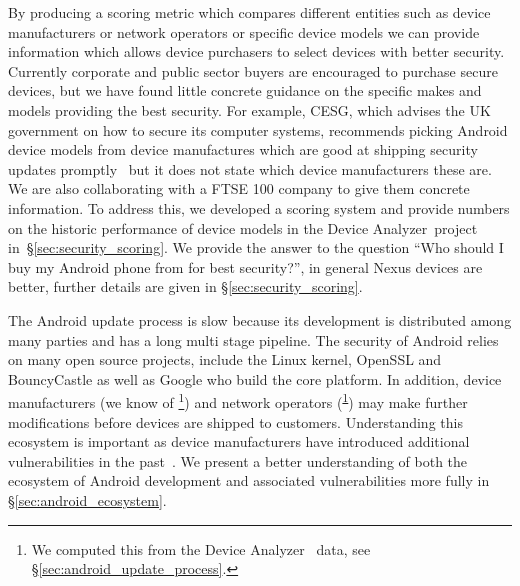 \documentclass{sig-alternate}
\newcommand{\da}{Device Analyzer}
\newcommand{\dafoot}{\textsuperscript{\ref{foot:dadata}}}
\begin{document}
By producing a scoring metric which compares different entities such as device manufacturers or network operators or specific device models we can provide information which allows device purchasers to select devices with better security.
Currently corporate and public sector buyers are encouraged to purchase secure devices, but we have found little concrete guidance on the specific makes and models providing the best security.
For example, CESG, which advises the UK government on how to secure its computer systems, recommends picking Android device models from device manufactures which are good at shipping security updates promptly~\cite{CESG2013} but it does not state which device manufacturers these are.
We are also collaborating with a FTSE 100 company to give them concrete information.
To address this, we developed a scoring system and provide numbers on the historic performance of device models in the \da\ project in~\S\ref{sec:security_scoring}.
We provide the answer to the question ``Who should I buy my Android phone from for best security?'', in general Nexus devices are better, further details are given in \S\ref{sec:security_scoring}.

The Android update process is slow because its development is distributed among many parties and has a long multi stage pipeline.
The security of Android relies on many open source projects, include the Linux kernel, OpenSSL and BouncyCastle as well as Google who build the core platform.
In addition, device manufacturers (we know of \daNumManufacturers\footnote{\label{foot:dadata}We computed this from the \da~\cite{Wagner2013} data, see \S\ref{sec:android_update_process}.}) and network operators (\daNumOperators\dafoot) may make further modifications before devices are shipped to customers.
Understanding this ecosystem is important as device manufacturers have introduced additional vulnerabilities in the past~\cite{Grace2012}.
We present a better understanding of both the ecosystem of Android development and associated vulnerabilities more fully in \S\ref{sec:android_ecosystem}.
\end{document}
